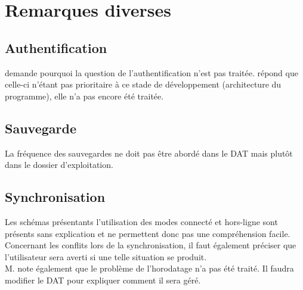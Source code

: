 \documentclass[11pt,fleqn]{report}
\begin{document}

\section{Remarques diverses}

\subsection{Authentification}

\mo demande pourquoi la question de l'authentification n'est pas traitée. \amo répond que celle-ci n'étant pas prioritaire à ce stade de développement (architecture du programme), elle n'a pas encore été traitée.


\subsection{Sauvegarde}

La fréquence des sauvegardes ne doit pas être abordé dans le DAT mais plutôt dans le dossier d'exploitation.


\subsection{Synchronisation}

Les schémas présentants l'utilisation des modes \og{}connecté\fg{} et \og{}hors-ligne\fg{} sont présents sans explication et ne permettent donc pas une compréhension facile.\\
Concernant les conflits lors de la synchronisation, il faut également préciser que l'utilisateur sera averti si une telle situation se produit.\\
M. \Agopian note également que le problème de l'horodatage n'a pas été traité. Il faudra modifier le DAT pour expliquer comment il sera géré.
\end{document}
